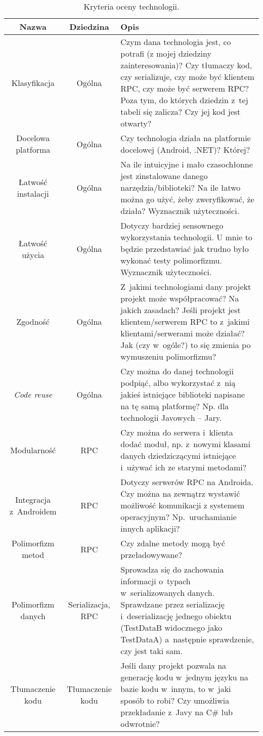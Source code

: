 \begin{table}[htbp]
	\centering
		\begin{tabular}{ | c | c | p{8cm} |}
			\hline
				\textbf{Nazwa} & \textbf{Dziedzina} & \textbf{Opis}\\
				\hline \hline
				Klasyfikacja & Ogólna & Czym dana technologia jest, co potrafi (z mojej dziedziny zainteresowania)? Czy tłumaczy kod, czy serializuje, czy może być klientem RPC, czy może być serwerem RPC? Poza tym, do których dziedzin z~tej tabeli się zalicza? Czy jej kod jest otwarty?\\
				\hline
				Docelowa platforma & Ogólna & Czy technologia działa na platformie docelowej (Android, .NET)? Której?\\
				\hline
				Łatwość instalacji & Ogólna & Na ile intuicyjne i mało czasochłonne jest zinstalowane danego narzędzia/biblioteki? Na ile łatwo można go użyć, żeby zweryfikować, że działa?  Wyznacznik użyteczności.\\
				\hline
				Łatwość użycia & Ogólna & Dotyczy bardziej sensownego wykorzystania technologii. U mnie to będzie przedstawiać jak trudno było wykonać testy polimorfizmu. Wyznacznik użyteczności.\\
				\hline
				Zgodność & Ogólna & Z~jakimi technologiami dany projekt projekt może współpracować? Na jakich zasadach? Jeśli projekt jest klientem/serwerem RPC to z~jakimi klientami/serwerami może działać? Jak (czy w~ogóle?) to się zmienia po wymuszeniu polimorfizmu? \\
				\hline
				\emph{Code reuse} & Ogólna & Czy można do danej technologii podpiąć, albo wykorzystać z~nią jakieś istniejące biblioteki napisane na tę samą platformę? Np. dla technologii Javowych -- Jary.\\
				\hline
				Modularność & RPC & Czy można do serwera i~klienta dodać moduł, np. z~nowymi klasami danych dziedziczącymi istniejące i~używać ich ze starymi metodami?\\
				\hline
				Integracja z~Androidem & RPC & Dotyczy serwerów RPC na Androida. Czy można na zewnątrz wystawić możliwość komunikacji z systemem operacyjnym? Np.\ uruchamianie innych aplikacji?\\
				\hline
				Polimorfizm metod & RPC & Czy zdalne metody mogą być przeładowywane?\\
				\hline
				Polimorfizm danych & Serializacja, RPC & Sprowadza się do zachowania informacji o~typach w~serializowanych danych. Sprawdzane przez serializację i~deserializację jednego obiektu (TestDataB widocznego jako TestDataA) a~następnie sprawdzenie, czy jest taki sam.\\
				\hline
				Tłumaczenie kodu & Tłumaczenie kodu & Jeśli dany projekt pozwala na generację kodu w~jednym języku na bazie kodu w~innym, to w~jaki sposób to robi? Czy umożliwia przekładanie z~Javy na C\# lub odwrotnie? \\
				\hline
		\end{tabular}
	\caption[Kryteria oceny technologii.]{Kryteria oceny technologii.}
	\label{tab:frameworks-criteria}
\end{table}

